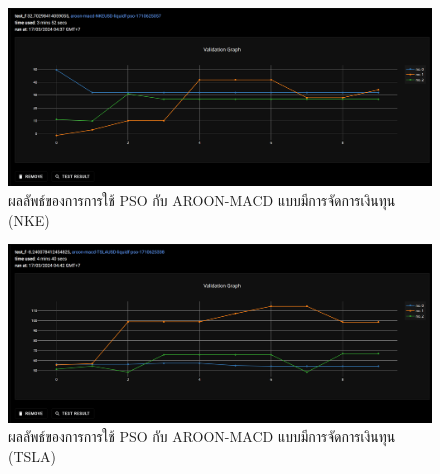 \begin{figure}[ht]
    \centering
    \includegraphics[width=\textwidth]{images/pso/aroon-macd/nke-liquid.png}
    \caption{ผลลัพธ์ของการการใช้ PSO กับ AROON-MACD แบบมีการจัดการเงินทุน (NKE)}
\end{figure}
\begin{figure}[ht]
    \centering
    \includegraphics[width=\textwidth]{images/pso/aroon-macd/tsla-liquid.png}
    \caption{ผลลัพธ์ของการการใช้ PSO กับ AROON-MACD แบบมีการจัดการเงินทุน (TSLA)}
\end{figure}


